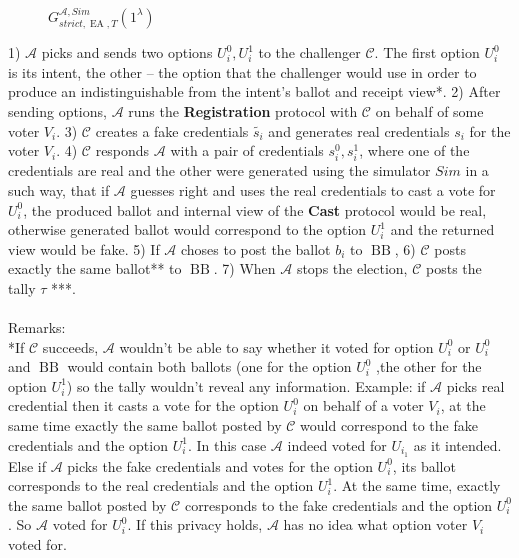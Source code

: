 \documentclass[12pt]{article}
\DeclareMathOperator{\ea}{EA}
\DeclareMathOperator{\bb}{BB}
\begin{document}
  \begin{figure}[h!]
 
        \caption{$G_{strict,\ea,T}^{\mathcal{A}, Sim}(1^{\lambda})$}
        \label{EAT is honest}
\end{figure}
1)  $\mathcal{A}$ picks and sends two options $U_i^0,U_i^1$ to the challenger $\mathcal{C}$. The first option $U_i^0$ is its intent, the other -- the option that the challenger would use in order to produce an indistinguishable from the intent's ballot and receipt view*. 2) After sending options, $\mathcal{A}$ runs the   \textbf{Registration} protocol with $\mathcal{C}$ on behalf of some voter $V_i$. 3) $\mathcal{C}$ creates a fake credentials $\tilde{s_i}$ and generates real credentials $s_i$ for the voter $V_i$. 4) $\mathcal{C}$ responds $\mathcal{A}$ with a pair of credentials $s_i^0,s_i^1$, where one of the credentials are real and the other were generated using the simulator $Sim$ in a such way, that if $\mathcal{A}$ guesses right and uses the real credentials to cast a vote for $U_i^0$, the produced ballot and internal view of the \textbf{Cast} protocol would be real, otherwise generated ballot would correspond to the option $U_i^1$ and the returned view would be fake. 5) If $\mathcal{A}$ choses to post the ballot $b_i$ to $\bb$, 6) $\mathcal{C}$ posts exactly the same ballot** to $\bb$. 7) When $\mathcal{A}$ stops the election, $\mathcal{C}$ posts the tally $\tau$ ***. \\\\
Remarks:\\
*If  $\mathcal{C}$ succeeds, $\mathcal{A}$ wouldn't be able to say whether it voted for option $U_i^0$ or $U_i^0$ and $\bb$ would contain both ballots (one for the option $U_i^0$ ,the other for the option $U_i^1$) so the tally wouldn't reveal any information. Example: if $\mathcal{A}$  picks real credential then it casts a vote for the option  $U_i^0$ on behalf of a voter $V_i$, at the same time exactly the same ballot posted by $\mathcal{C}$ would correspond to the fake credentials and the option $U_i^1$. In this case $\mathcal{A}$ indeed voted for $U_{i_1}$ as it intended. Else if $\mathcal{A}$ picks the fake credentials and votes for the option $U_i^0$,  its ballot corresponds to the real credentials and  the option $U_i^1$. At the same time, exactly the same ballot posted by $\mathcal{C}$ corresponds to the fake credentials  and the option $U_i^0$. So $\mathcal{A}$  voted for $U_i^0$. If this privacy holds,  $\mathcal{A}$ has no idea what option voter $V_i$ voted for. \\\\
\end{document}
